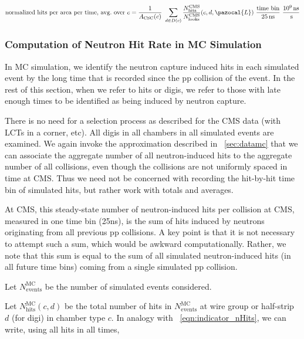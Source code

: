 \begin{equation}
    \label{eqn:hits_perA_perT_perCSC_Lumi}
\text{normalized hits per area per time, avg.\ over $c$} = 
    \frac{1}{A_\text{CSC}(c)}  \  \sum_{d\in D(c)}{\frac{{N}^\text{CMS}_\text{hits}}{N^\text{CMS}_{\text{looks}}}(c, d, \pazocal{L})}  \  \frac{\text{time bin}}{25\unit{ns}}  \  \frac{10^9\unit{ns}}{\unit{s}}
\end{equation}

\subsubsection{Computation of Neutron Hit Rate in MC Simulation}

In MC simulation, we identify the neutron capture induced hits in each
simulated event by the long time that is recorded since the pp
collision of the event.  In the rest of this section, when we refer to
hits or digis, we refer to those with late enough times to be
identified as being induced by neutron capture.

There is no need for a selection process as described for the CMS
data (with LCTs in a corner, etc).  All digis in all chambers in all
simulated events are examined.  We again invoke the approximation
described in \Sec~\ref{sec:datamc} that we can associate the aggregate
number of all neutron-induced hits to the aggregate number of all \pp
collisions, even though the \pp collisions are not uniformly spaced in
time at CMS.  Thus we need not be concerned with recording the
hit-by-hit time bin of simulated hits, but rather work with totals and
averages.


At CMS, this steady-state number of neutron-induced hits per \pp
collision at CMS, measured in one time bin (25\unit{ns}), is the sum
of hits induced by neutrons originating from all previous pp
collisions. A key point is that it is not necessary to attempt such a
sum, which would be awkward computationally.  Rather, we note that
this sum is equal to the sum of all simulated neutron-induced hits
(in all future time bins) coming from a single simulated pp collision.


Let $N_\text{events}^\text{MC}$ be the number of simulated events
considered.

Let $N_\text{hits}^\text{MC}(c, d)$ be the total number of hits in
$N^\text{MC}_\text{events}$ at wire group or half-strip $d$ (for digi)
in chamber type $c$. In analogy with \Eq~\ref{eqn:indicator_nHits}, we
can write, using all hits in all times,

